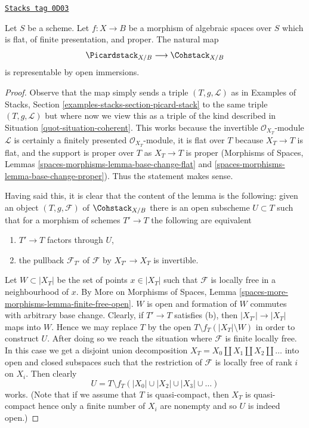 \begin{lemma}
\label{quot-lemma-picard-stack-open-in-coh}
\href{https://stacks.math.columbia.edu/tag/0D03}{\texttt{Stacks tag 0D03}}

Let $S$ be a scheme. Let $f : X \to B$ be a morphism of algebraic spaces
over $S$ which is flat, of finite presentation, and proper.
The natural map
$$
\Picardstack_{X/B} \longrightarrow \Cohstack_{X/B}
$$
is representable by open immersions.
\end{lemma}

\begin{proof}

Observe that the map simply sends a triple $(T, g, \mathcal{L})$
as in Examples of Stacks, Section \ref{examples-stacks-section-picard-stack}
to the same triple $(T, g, \mathcal{L})$ but where now we view
this as a triple of the kind described in
Situation \ref{quot-situation-coherent}.
This works because the invertible $\mathcal{O}_{X_T}$-module
$\mathcal{L}$ is certainly a finitely presented $\mathcal{O}_{X_T}$-module,
it is flat over $T$ because $X_T \to T$ is flat, and the support is
proper over $T$ as $X_T \to T$ is proper
(Morphisms of Spaces, Lemmas \ref{spaces-morphisms-lemma-base-change-flat}
and \ref{spaces-morphisms-lemma-base-change-proper}).
Thus the statement makes sense.

\medskip\noindent
Having said this, it is clear that the content of the lemma is the
following: given an object $(T, g, \mathcal{F})$ of
$\Cohstack_{X/B}$ there is an open subscheme $U \subset T$
such that for a morphism of schemes $T' \to T$ the following
are equivalent
\begin{enumerate}
\item[(a)] $T' \to T$ factors through $U$,
\item[(b)] the pullback $\mathcal{F}_{T'}$ of
$\mathcal{F}$ by $X_{T'} \to X_T$ is invertible.
\end{enumerate}
Let $W \subset |X_T|$ be the set of points $x \in |X_T|$
such that $\mathcal{F}$ is locally free in a neighbourhood of $x$. By
More on Morphisms of Spaces, Lemma
\ref{spaces-more-morphisms-lemma-finite-free-open}.
$W$ is open and formation
of $W$ commutes with arbitrary base change.
Clearly, if $T' \to T$ satisfies (b), then $|X_{T'}| \to |X_T|$
maps into $W$. Hence we may replace $T$ by the open
$T \setminus f_T(|X_T| \setminus W)$ in order
to construct $U$. After doing so we reach the situation
where $\mathcal{F}$ is finite locally free.
In this case we get a disjoint union decomposition
$X_T = X_0 \amalg X_1 \amalg X_2 \amalg \ldots$
into open and closed subspaces such that the restriction of
$\mathcal{F}$ is locally free of rank $i$ on $X_i$. Then clearly
$$
U = T \setminus f_T(|X_0| \cup |X_2| \cup |X_3| \cup \ldots )
$$
works. (Note that if we assume that $T$ is quasi-compact, then
$X_T$ is quasi-compact hence only a finite number of $X_i$
are nonempty and so $U$ is indeed open.)
\end{proof}

